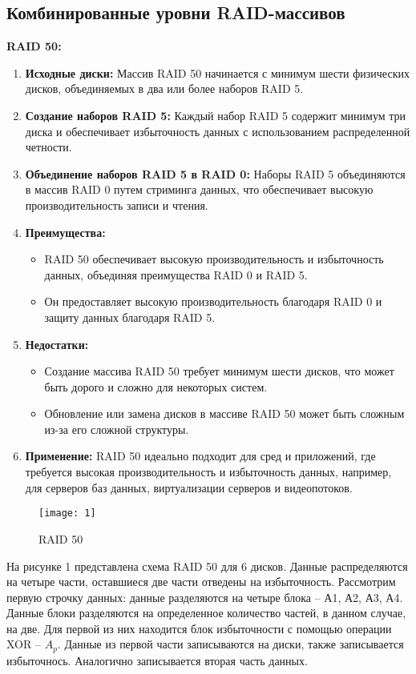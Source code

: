 \documentclass[10pt,a4paper,final]{article} %
\begin{document}
\newpage
\subsection{Комбинированные уровни RAID-массивов}

{\large \textbf{RAID 50:}}
\begin{enumerate}
	\item \textbf{Исходные диски:} Массив RAID 50 начинается с минимум шести физических дисков, объединяемых в два или более наборов RAID 5.
	
	\item \textbf{Создание наборов RAID 5:} Каждый набор RAID 5 содержит минимум три диска и обеспечивает избыточность данных с использованием распределенной четности.
	
	\item \textbf{Объединение наборов RAID 5 в RAID 0:} Наборы RAID 5 объединяются в массив RAID 0 путем стриминга данных, что обеспечивает высокую производительность записи и чтения.
	
	\item \textbf{Преимущества:}
	\begin{itemize}
		\item RAID 50 обеспечивает высокую производительность и избыточность данных, объединяя преимущества RAID 0 и RAID 5.
		\item Он предоставляет высокую производительность благодаря RAID 0 и защиту данных благодаря RAID 5.
	\end{itemize}
	
	\item \textbf{Недостатки:}
	\begin{itemize}
		\item Создание массива RAID 50 требует минимум шести дисков, что может быть дорого и сложно для некоторых систем.
		\item Обновление или замена дисков в массиве RAID 50 может быть сложным из-за его сложной структуры.
	\end{itemize}
	
	\item \textbf{Применение:} RAID 50 идеально подходит для сред и приложений, где требуется высокая производительность и избыточность данных, например, для серверов баз данных, виртуализации серверов и видеопотоков.
\end{enumerate}

\newpage
\begin{figure}[h]
\centering
\texttt{[image: 1]}
\caption{RAID 50}
\end{figure}
На рисунке 1 представлена схема RAID 50 для 6 дисков. Данные распределяются на четыре части, оставшиеся две части отведены на избыточность. Рассмотрим первую строчку данных: данные разделяются на четыре блока -- А1, А2, А3, А4. Данные блоки разделяются на определенное количество частей, в данном случае, на две. Для первой из них находится блок избыточности с помощью операции XOR -- $A_p$. Данные из первой части записываются на диски, также записывается избыточнось. Аналогично записывается вторая часть данных. 
\end{document}
